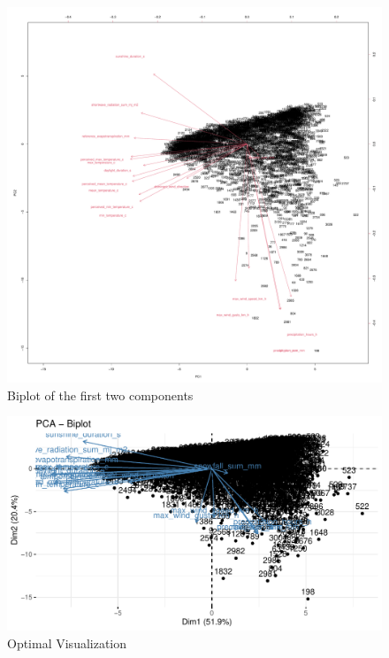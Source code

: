 \documentclass[
]{article}
\begin{document}
\begin{figure}[H]

{\centering \includegraphics[width=0.8\linewidth]{Assignment2_Group9_files/figure-latex/unnamed-chunk-7-1} 

}

\caption{Biplot of the first two components}\label{fig:unnamed-chunk-7}
\end{figure}
\begin{figure}[H]

{\centering \includegraphics[width=0.8\linewidth]{Assignment2_Group9_files/figure-latex/unnamed-chunk-8-1} 

}

\caption{Optimal Visualization}\label{fig:unnamed-chunk-8}
\end{figure}
\end{document}
